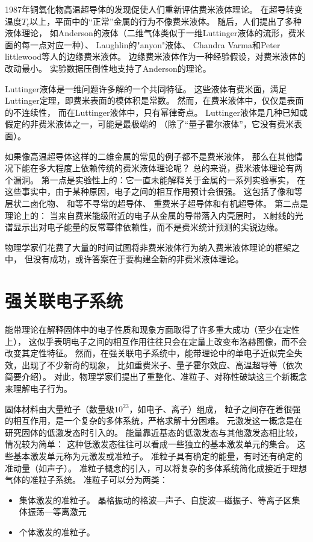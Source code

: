 \documentclass{article}
\begin{document}
1987年铜氧化物高温超导体的发现促使人们重新评估费米液体理论。
在超导转变温度$T_c$以上，平面中的“正常”金属的行为不像费米液体。
随后，人们提出了多种液体理论，
如Anderson的液体（二维气体类似于一维Luttinger液体的流形，费米面的每一点对应一种）、
Laughlin的"anyon"液体、
Chandra Varma和Peter littlewood等人的边缘费米液体。
边缘费米液体作为一种经验假设，对费米液体的改动最小。
实验数据压倒性地支持了Anderson的理论。

Luttinger液体是一维问题许多解的一个共同特征。
这些液体有费米面，满足Luttinger定理，即费米表面的模体积是常数。
然而，在费米液体中，仅仅是表面的不连续性，
而在Luttinger液体中，只有幂律奇点。
Luttinger液体是几种已知或假定的非费米液体之一，可能是最极端的
（除了“量子霍尔液体”，它没有费米表面）。

如果像高温超导体这样的二维金属的常见的例子都不是费米液体，
那么在其他情况下能在多大程度上依赖传统的费米液体理论呢？
总的来说，费米液体理论有两个漏洞。
第一点是实验性上的：它一直未能解释关于金属的一系列实验事实，
在这些事实中，由于某种原因，电子之间的相互作用预计会很强。
这包括了像和等层状二卤化物、
和等不寻常的超导体、
重费米子超导体和有机超导体。
第二点是理论上的：
当来自费米能级附近的电子从金属的导带落入内壳层时，
X射线的光谱显示出对电子能量的反常幂律依赖性，而不是费米统计预测的尖锐边缘。 

物理学家们花费了大量的时间试图将非费米液体行为纳入费米液体理论的框架之中，
但没有成功，或许答案在于要构建全新的非费米液体理论。

\section{强关联电子系统}
能带理论在解释固体中的电子性质和现象方面取得了许多重大成功（至少在定性上），
这似乎表明电子之间的相互作用往往只会在定量上改变布洛赫图像，而不会改变其定性特征。
然而，在强关联电子系统中，能带理论中的单电子近似完全失效，出现了不少新奇的现象，
比如重费米子、量子霍尔效应、高温超导等（依次简要介绍）。
对此，物理学家们提出了重整化、准粒子、对称性破缺这三个新概念来理解电子行为。


固体材料由大量粒子（数量级$10^{23}$，如电子、离子）组成，
粒子之间存在着很强的相互作用，是一个复杂的多体系统，严格求解十分困难。
元激发这一概念是在研究固体的低激发态时引入的。
能量靠近基态的低激发态与其他激发态相比较，情况较为简单：
这种低激发态往往可以看成一些独立的基本激发单元的集合。
这些基本激发单元称为元激发或准粒子。
准粒子具有确定的能量，有时还有确定的准动量（如声子）。
准粒子概念的引入，可以将复杂的多体系统简化成接近于理想气体的准粒子系统。
准粒子可以分为两类：
\begin{itemize}
    \item 集体激发的准粒子。
    晶格振动的格波---声子、自旋波---磁振子、等离子区集体振荡---等离激元
    \item 个体激发的准粒子。
\end{itemize}
\end{document}
